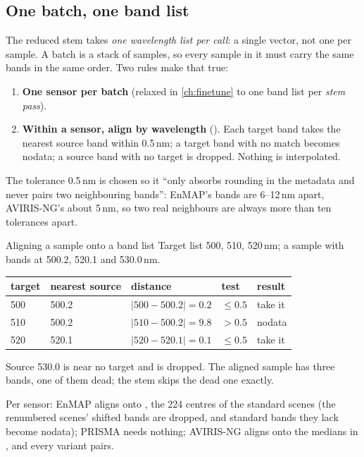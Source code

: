 \subsection{One batch, one band list}\label{sec:pretrain:onelist}

The reduced stem takes \emph{one wavelength list per call}: a single  vector, not one per sample. A batch is a stack
of samples, so every sample in it must carry the same bands in the same order. Two rules make that true:
\begin{enumerate}
  \item \textbf{One sensor per batch} (relaxed in \cref{ch:finetune} to one band list per \emph{stem pass}).
  \item \textbf{Within a sensor, align by wavelength} (). Each target band takes the nearest
    source band within 0.5\,nm; a target band with no match becomes nodata; a source band with no target is dropped. Nothing is
    interpolated.
\end{enumerate}
The tolerance 0.5\,nm is chosen so it ``only absorbs rounding in the metadata and never pairs two neighbouring bands'': EnMAP's
bands are 6--12\,nm apart, AVIRIS-NG's about 5\,nm, so two real neighbours are always more than ten tolerances apart.

\begin{worked}[label={we:pretrain:align}]{Aligning a sample onto a band list}
Target list 500, 510, 520\,nm; a sample with bands at 500.2, 520.1 and 530.0\,nm.
\begin{center}
\begin{tabular}{lllll}
\toprule
target & nearest source & distance & test & result\\
\midrule
500 & 500.2 & $|500 - 500.2| = 0.2$ & $\le 0.5$ & take it\\
510 & 500.2 & $|510 - 500.2| = 9.8$ & $> 0.5$ & nodata\\
520 & 520.1 & $|520 - 520.1| = 0.1$ & $\le 0.5$ & take it\\
\bottomrule
\end{tabular}
\end{center}
Source 530.0 is near no target and is dropped. The aligned sample has three bands, one of them dead; the stem skips the dead one
exactly.
\end{worked}

Per sensor: EnMAP aligns onto , the 224 centres of the standard scenes (the renumbered scenes' shifted bands
are dropped, and standard bands they lack become nodata); PRISMA needs nothing; AVIRIS-NG aligns onto the medians in
, and every variant pairs.


